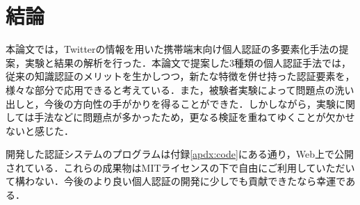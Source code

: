 \chapter{結論}\label{chap:conclusion}
本論文では，Twitterの情報を用いた携帯端末向け個人認証の多要素化手法の提案，実験と結果の解析を行った．本論文で提案した3種類の個人認証手法では，従来の知識認証のメリットを生かしつつ，新たな特徴を併せ持った認証要素を，様々な部分で応用できると考えている．また，被験者実験によって問題点の洗い出しと，今後の方向性の手がかりを得ることができた．しかしながら，実験に関しては手法などに問題点が多かったため，更なる検証を重ねてゆくことが欠かせないと感じた．

開発した認証システムのプログラムは付録\ref{apdx:code}にある通り，Web上で公開されている．これらの成果物はMITライセンスの下で自由にご利用していただいて構わない．今後のより良い個人認証の開発に少しでも貢献できたなら幸運である．

\newpage
